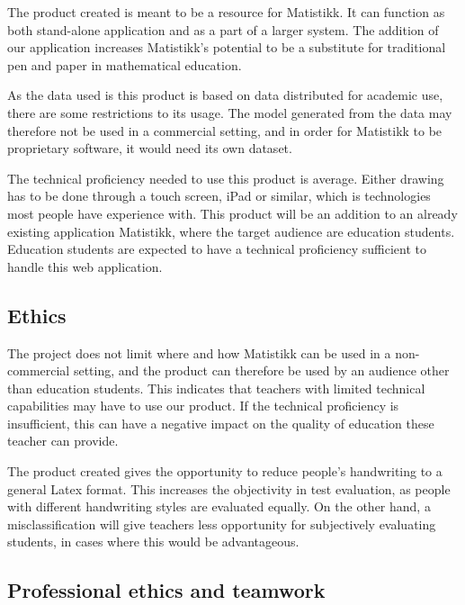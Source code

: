 
% 

The product created is meant to be a resource for Matistikk. It can function as both stand-alone application and as a part of a larger system. The addition of our application increases Matistikk's potential to be a substitute for traditional pen and paper in mathematical education.

As the data used is this product is based on data distributed for academic use, there are some restrictions to its usage. The model generated from the data may therefore not be used in a commercial setting, and in order for Matistikk to be proprietary software, it would need its own dataset.

The technical proficiency needed to use this product is average. Either drawing has to be done through a touch screen, iPad or similar, which is technologies most people have experience with. This product will be an addition to an already existing application Matistikk, where the target audience are education students. Education students are expected to have a technical proficiency sufficient to handle this web application.

\subsection{Ethics}
The project does not limit where and how Matistikk can be used in a non-commercial setting, and the product can therefore be used by an audience other than education students. This indicates that teachers with limited technical capabilities may have to use our product. If the technical proficiency is insufficient, this can have a negative impact on the quality of education these teacher can provide. 

The product created gives the opportunity to reduce people's handwriting to a general Latex format. This increases the objectivity in test evaluation, as people with different handwriting styles are evaluated equally. On the other hand, a misclassification will give teachers less opportunity for subjectively evaluating students, in cases where this would be advantageous.

\subsection{Professional ethics and teamwork}

